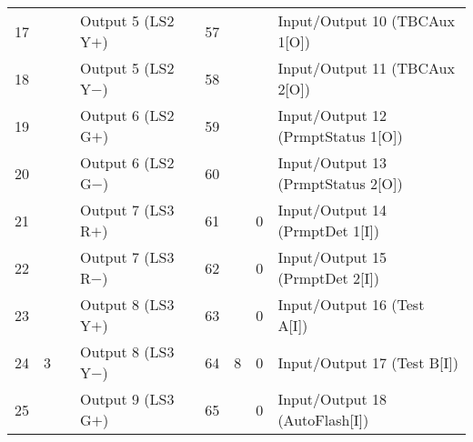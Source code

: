 \documentclass[]{article}
\begin{document}
\begin{landscape}
\begin{table}[ht]
\begin{tabular}{lllllllll}
			17           &                     &                    & Output 5 (LS2 Y$+$)            &                    & 57                       &                                            &                                            & Input/Output 10 (TBCAux 1{[}O{]})      \\
			18           &                     &                    & Output 5 (LS2 Y$-$)            &                    & 58                       &                                            &                                            & Input/Output 11 (TBCAux 2{[}O{]})      \\
			19           &                     &                    & Output 6 (LS2 G$+$)            &                    & 59                       &                                            &                                            & Input/Output 12 (PrmptStatus 1{[}O{]}) \\
			20           &                     &                    & Output 6 (LS2 G$-$)            &                    & 60                       &                                            & \multirow{-4}{*}{}                         & Input/Output 13 (PrmptStatus 2{[}O{]}) \\ \cline{8-9} 
			21           &                     &                    & Output 7 (LS3 R$+$)            &                    & 61                       &                                            & 0                                          & Input/Output 14 (PrmptDet 1{[}I{]})    \\
			22           &                     &                    & Output 7 (LS3 R$-$)            &                    & 62                       &                                            & 0                                          & Input/Output 15 (PrmptDet 2{[}I{]})    \\
			23           &                     &                    & Output 8 (LS3 Y$+$)            &                    & 63                       &                                            & 0                                          & Input/Output 16 (Test A{[}I{]})        \\
			24           & \multirow{-8}{*}{3} & \multirow{-8}{*}{} & Output 8 (LS3 Y$-$)            &                    & 64                       & \multirow{-8}{*}{8}                        & 0                                          & Input/Output 17 (Test B{[}I{]})        \\ \cline{1-4} \cline{6-9} 
			25           &                     &                    & Output 9 (LS3 G$+$)            &                    & 65                       &                                            & 0                                          & Input/Output 18 (AutoFlash{[}I{]})     \\

\end{tabular}
\end{table}
\end{landscape}
\end{document}
